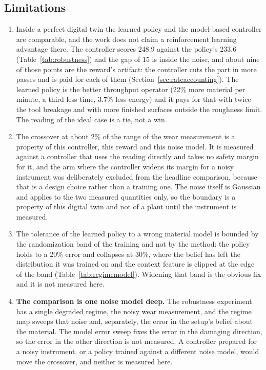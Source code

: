 \documentclass[11pt,a4paper]{article}
\begin{document}
\subsection{Limitations}
\label{sec:limitations}
\begin{enumerate}
    \item Inside a perfect digital twin the learned policy and the model-based controller are comparable, and the work does not claim a reinforcement learning advantage there. The controller scores 248.9 against the policy's 233.6 (Table~\ref{tab:robustness}) and the gap of 15 is inside the noise, and about nine of those points are the reward's artifact: the controller cuts the part in more passes and is paid for each of them (Section~\ref{sec:rateaccounting}). The learned policy is the better throughput operator (22\% more material per minute, a third less time, 3.7\% less energy) and it pays for that with twice the tool breakage and with more finished surfaces outside the roughness limit. The reading of the ideal case is a tie, not a win.
    \item The crossover at about 2\% of the range of the wear measurement is a property of this controller, this reward and this noise model. It is measured against a controller that uses the reading directly and takes no safety margin for it, and the arm where the controller widens its margin for a noisy instrument was deliberately excluded from the headline comparison, because that is a design choice rather than a training one. The noise itself is Gaussian and applies to the two measured quantities only, so the boundary is a property of this digital twin and not of a plant until the instrument is measured.
    \item The tolerance of the learned policy to a wrong material model is bounded by the randomization band of the training and not by the method: the policy holds to a 20\% error and collapses at 30\%, where the belief has left the distribution it was trained on and the context feature is clipped at the edge of the band (Table~\ref{tab:regimemodel}). Widening that band is the obvious fix and it is not measured here.
    \item \textbf{The comparison is one noise model deep.} The robustness experiment has a single degraded regime, the noisy wear measurement, and the regime map sweeps that noise and, separately, the error in the setup's belief about the material. The model error sweep fixes the error in the damaging direction, so the error in the other direction is not measured. A controller prepared for a noisy instrument, or a policy trained against a different noise model, would move the crossover, and neither is measured here.

\end{enumerate}
\end{document}
